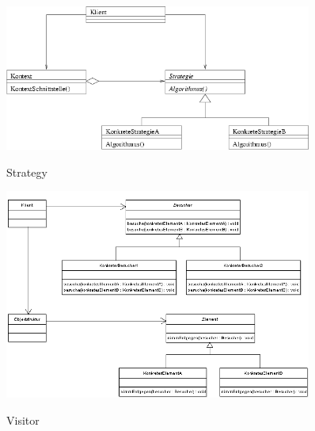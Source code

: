 \begin{figure}[htb]
    \centering
    \begin{minipage}[t]{0.45\linewidth}
		\centering
		\includegraphics[width=0.9\textwidth]{images/strategy}
		\label{fig:strategy}
		\caption{Strategy}
	\end{minipage}%
	\hfill
    \begin{minipage}[t]{0.45\linewidth}
		\centering
		\includegraphics[width=0.9\textwidth]{images/visitor}
		\label{fig:visitor}
		\caption{Visitor}
	\end{minipage}
\end{figure}


